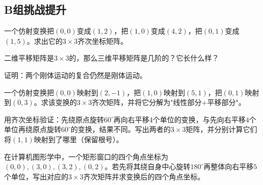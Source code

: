\subsection*{B组\quad 挑战提升}
\begin{exercise}
\item 一个仿射变换把$(0,0)$变成$(1,2)$，把$(1,0)$变成$(4,2)$，把$(0,1)$变成$(1,5)$。求出它的$3\times3$齐次坐标矩阵。
\item 二维平移矩阵是$3\times3$的，那么三维平移矩阵是几阶的？它长什么样？
\item 证明：两个刚体运动的复合仍然是刚体运动。
\item 一个仿射变换把$(0,0)$映射到$(2,-1)$，把$(1,0)$映射到$(5,1)$，把$(0,1)$映射到$(0,3)$。求该变换的$3\times3$齐次矩阵，并将它分解为"线性部分+平移部分"。
\item 用齐次坐标验证：先绕原点旋转$60^\circ$再向右平移$4$个单位的变换，与先向右平移$4$个单位再绕原点旋转$60^\circ$的变换，结果不同。写出两者的$3\times3$矩阵，并分别计算它们将$(1,1)$映射到了哪里（保留根号）。
\item 在计算机图形学中，一个矩形窗口的四个角点坐标为$(0,0),(3,0),(3,2),(0,2)$。若先将其绕自身中心旋转$180^\circ$再整体向右平移$5$个单位，写出对应的$3\times3$齐次矩阵并求变换后的四个角点坐标。
\end{exercise}

\newpage
